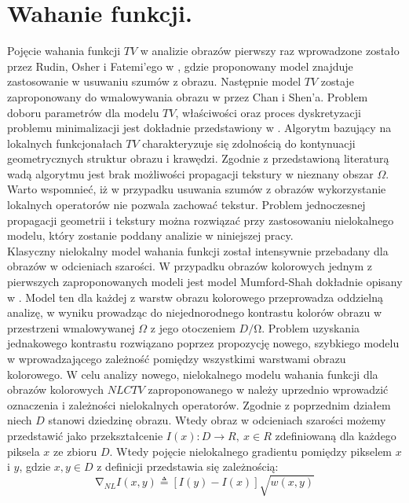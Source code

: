 \documentclass[12pt, twoside, openany]{report}
\theoremstyle{definition}
\begin{document}
\section{Wahanie funkcji.}
Pojęcie wahania funkcji $TV$ w analizie obrazów pierwszy raz wprowadzone zostało przez Rudin, Osher i Fatemi’ego w \cite{rudin1992nonlinear}, gdzie proponowany model znajduje zastosowanie w usuwaniu szumów z obrazu. Następnie model $TV$ zostaje zaproponowany do wmalowywania obrazu w \cite{MathematicalModelsforNLTextureInpainting} przez Chan i Shen’a. Problem doboru parametrów dla modelu $TV$, właściwości oraz proces dyskretyzacji problemu minimalizacji jest dokładnie przedstawiony w \cite{getreuer2012total}. Algorytm bazujący na lokalnych funkcjonałach $TV$  charakteryzuje się zdolnością do kontynuacji geometrycznych struktur obrazu i krawędzi. Zgodnie z przedstawioną literaturą wadą algorytmu jest brak możliwości propagacji tekstury w nieznany obszar $\Omega$. Warto wspomnieć, iż w przypadku usuwania szumów z obrazów wykorzystanie lokalnych operatorów nie pozwala zachować tekstur. Problem jednoczesnej propagacji geometrii i tekstury można rozwiązać przy zastosowaniu nielokalnego modelu, który zostanie poddany analizie w niniejszej pracy. \\
Klasyczny nielokalny model wahania funkcji został intensywnie przebadany dla obrazów w odcieniach szarości. W przypadku obrazów kolorowych jednym z pierwszych zaproponowanych modeli jest model Mumford-Shah dokładnie opisany w \cite{jung2011nonlocal}. Model ten dla każdej z warstw obrazu kolorowego przeprowadza oddzielną analizę, w wyniku prowadząc do niejednorodnego kontrastu kolorów obrazu w przestrzeni wmalowywanej $\Omega$ z jego otoczeniem $D/\mathrm{\Omega}$. Problem uzyskania jednakowego kontrastu rozwiązano poprzez propozycję nowego, szybkiego modelu w \cite{duan2015fast} wprowadzającego zależność pomiędzy wszystkimi warstwami obrazu kolorowego. W celu analizy nowego, nielokalnego modelu wahania funkcji dla obrazów kolorowych $NLCTV$ zaproponowanego w \cite{duan2015fast} należy uprzednio wprowadzić oznaczenia i zależności nielokalnych operatorów. 
Zgodnie z poprzednim działem niech $D$ stanowi dziedzinę obrazu. Wtedy obraz w odcieniach szarości możemy przedstawić jako przekształcenie $I\left(x\right):D\longrightarrow R,\ x\in R$ zdefiniowaną dla każdego piksela $x$ ze zbioru $D$. Wtedy pojęcie nielokalnego gradientu pomiędzy pikselem $x$ i $y$, gdzie $x,y\in D$ z definicji przedstawia się zależnością:
\begin{equation}
{\mathrm{\nabla }}_{NL}I\left(x,y\right)\triangleq \left[I\left(y\right)-I\left(x\right)\right]\sqrt{w(x,y)}
\label{NLGRAD}
\end{equation}
\end{document}
